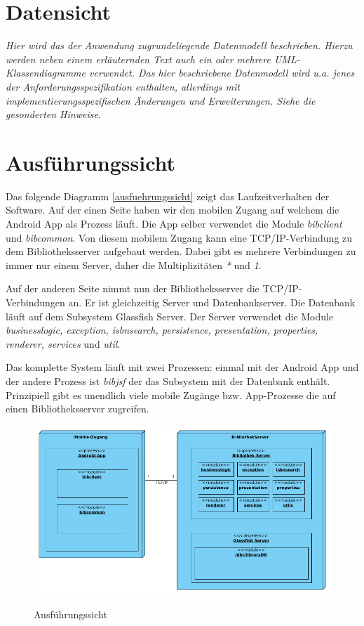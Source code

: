\documentclass[fontsize=12pt,paper=a4,twoside]{scrartcl}
\begin{document}
\section{Datensicht}
\label{sec:datensicht}

{\it Hier wird das der Anwendung zugrundeliegende Datenmodell
  beschrieben. Hierzu werden neben einem erläuternden Text auch ein
  oder mehrere {UML}-Klassendiagramme verwendet. Das hier beschriebene
  Datenmodell wird u.a. jenes der Anforderungsspezifikation enthalten,
  allerdings mit implementierungsspezifischen Änderungen und
  Erweiterungen. Siehe die gesonderten Hinweise.}
  
  

\section{Ausführungssicht}

Das folgende Diagramm \vref{ausfuehrungssicht} zeigt das Laufzeitverhalten der Software.
Auf der einen Seite haben wir den mobilen Zugang auf welchem die Android App als Prozess läuft. Die App selber verwendet die Module \emph{bibclient} und \emph{bibcommon}. Von diesem mobilem Zugang kann eine TCP/IP-Verbindung zu dem Bibliotheksserver aufgebaut werden. Dabei gibt es mehrere Verbindungen zu immer nur einem Server, daher die Multiplizitäten \emph{*} und \emph{1}.

Auf der anderen Seite nimmt nun der Bibliotheksserver die TCP/IP-Verbindungen an. Er ist gleichzeitig Server und Datenbankserver. Die Datenbank läuft auf dem Subsystem Glassfish Server. Der Server verwendet die Module \emph{businesslogic, exception, isbnsearch, persistence, presentation, properties, renderer, services} und \emph{util}.

Das komplette System läuft mit zwei Prozessen: einmal mit der Android App und der andere Prozess ist \emph{bibjsf} der das Subsystem mit der Datenbank enthält. Prinzipiell gibt es unendlich viele mobile Zugänge bzw. App-Prozesse die auf einen Bibliotheksserver zugreifen.

\begin{figure} [H] 
\caption{Ausführungssicht} 
	\includegraphics[width=1\textwidth]{Diagramme/ausfuehrungssicht.png} 
	\label{ausfuehrungssicht} 
\end{figure}
\label{sec:ausfuehrung}
\end{document}
